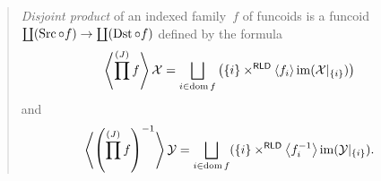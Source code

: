 \begin{quotation}
\begin{defn}
\emph{Disjoint product} of an indexed family~$f$ of funcoids is
a funcoid $\coprod(\operatorname{Src}\circ f)\to\coprod(\operatorname{Dst}\circ f)$ defined by the formula
\[
\supfun{\prod^{(J)}f} \mathcal{X} =
\bigsqcup_{i\in\dom f}
\left(\{i\}\times^{\mathsf{RLD}}\supfun{f_i}\im(\mathcal{X}|_{\{i\}})\right)
\]
and
\[
\supfun{\left(\prod^{(J)}f\right)^{-1}} \mathcal{Y} =
\bigsqcup_{i\in\dom f}
(\{i\}\times^{\mathsf{RLD}}\supfun{f_i^{-1}}\im(\mathcal{Y}|_{\{i\}}).
\]
\end{defn}
\end{quotation}

